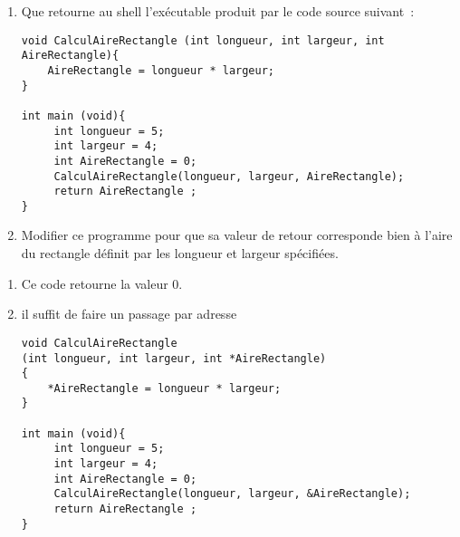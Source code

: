 \begin{enumerate}
\item Que retourne au shell l'ex\'ecutable produit par le code source suivant~:
\begin{verbatim}
void CalculAireRectangle (int longueur, int largeur, int AireRectangle){
	AireRectangle = longueur * largeur; 
}

int main (void){
     int longueur = 5;
     int largeur = 4;
     int AireRectangle = 0;
     CalculAireRectangle(longueur, largeur, AireRectangle);
     return AireRectangle ;
}
\end{verbatim}
\item Modifier ce programme pour que sa valeur de retour corresponde
  bien \`a l'aire du rectangle d\'efinit par les longueur et largeur
  sp\'ecifi\'ees.
\end{enumerate}

\ifcorrection
\begin{enumerate}
\item Ce code retourne la valeur 0.
\item il suffit de faire un passage par adresse
\begin{verbatim}
void CalculAireRectangle 
(int longueur, int largeur, int *AireRectangle)
{
	*AireRectangle = longueur * largeur; 
}

int main (void){
     int longueur = 5;
     int largeur = 4;
     int AireRectangle = 0;
     CalculAireRectangle(longueur, largeur, &AireRectangle);
     return AireRectangle ;
}
\end{verbatim}
\end{enumerate}
\fi









